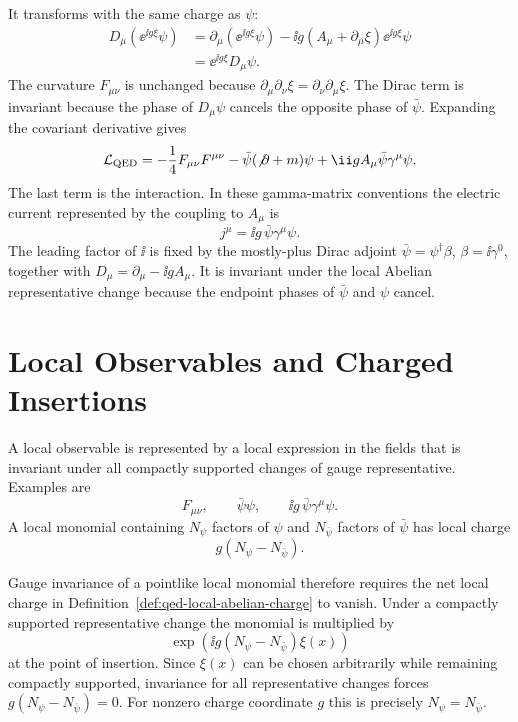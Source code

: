 It transforms with the same charge as \(\psi\):
\[
\begin{aligned}
  D_\mu(\ee^{\ii g\xi}\psi)
  &=
  \partial_\mu(\ee^{\ii g\xi}\psi)
  -\ii g(A_\mu+\partial_\mu\xi)\ee^{\ii g\xi}\psi  \\
  &=
  \ee^{\ii g\xi}D_\mu\psi .
\end{aligned}
\]
The curvature \(F_{\mu\nu}\) is unchanged because
\(\partial_\mu\partial_\nu\xi=\partial_\nu\partial_\mu\xi\).  The Dirac term
is invariant because the phase of \(D_\mu\psi\) cancels the opposite phase of
\(\bar\psi\).  Expanding the covariant derivative gives
\[
  \mathcal L_{\mathrm{QED}}
  =
  -\frac14F_{\mu\nu}F^{\mu\nu}
  -\bar\psi(\not\partial+m)\psi
  +\ii gA_\mu\bar\psi\gamma^\mu\psi .
\]
The last term is the interaction. In these gamma-matrix conventions the
electric current represented by the coupling to \(A_\mu\) is
\[
  j^\mu=\ii g\,\bar\psi\gamma^\mu\psi .
\]
The leading factor of \(\ii\) is fixed by the mostly-plus Dirac adjoint
\(\bar\psi=\psi^\dagger\beta\), \(\beta=\ii\gamma^0\), together with
\(D_\mu=\partial_\mu-\ii gA_\mu\).
It is invariant under the local Abelian representative change because the
endpoint phases of \(\bar\psi\) and \(\psi\) cancel.

\section{Local Observables and Charged Insertions}

\begin{definition}
\label{def:qed-local-abelian-charge}
A local observable is represented by a local expression in the fields that is
invariant under all compactly supported changes of gauge representative.
Examples are
\[
  F_{\mu\nu},\qquad
  \bar\psi\psi,\qquad
  \ii g\,\bar\psi\gamma^\mu\psi .
\]
A local monomial containing \(N_\psi\) factors of \(\psi\) and
\(N_{\bar\psi}\) factors of \(\bar\psi\) has local charge
\[
  g(N_\psi-N_{\bar\psi}) .
\]
\end{definition}

\begin{remark}
\label{prop:qed-pointlike-local-neutrality}
Gauge invariance of a pointlike local monomial therefore requires the net
local charge in Definition~\ref{def:qed-local-abelian-charge} to vanish.
Under a compactly supported representative change the monomial is multiplied
by
\[
  \exp\!\left(\ii g(N_\psi-N_{\bar\psi})\xi(x)\right)
\]
at the point of insertion.  Since \(\xi(x)\) can be chosen arbitrarily while
remaining compactly supported, invariance for all representative changes
forces \(g(N_\psi-N_{\bar\psi})=0\).  For nonzero charge coordinate \(g\) this
is precisely \(N_\psi=N_{\bar\psi}\).
\end{remark}

